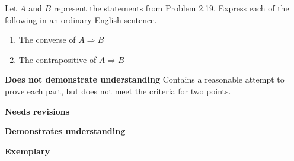 \documentclass[letterpaper, 11pt]{ximera}
\begin{document}
\begin{solution}
\end{solution}


\begin{ex}
 Let $A$ and $B$ represent the statements from Problem 2.19. Express each of the following in an ordinary English sentence.
 
\begin{enumerate}[label=(\alph*)]
 \item The converse of $A\Rightarrow B$
  \item The contrapositive of $A\Rightarrow B$
\end{enumerate}
\end{ex}

\begin{writeRubric}
    \item \textbf{Does not demonstrate understanding}
     Contains a reasonable attempt to prove each part, but does not meet the criteria for two points.
    \item \textbf{Needs revisions}
     
    \item \textbf{Demonstrates understanding}
    
    \item \textbf{Exemplary}
        
\end{writeRubric}
                                       \begin{solution}
\end{solution}
\end{document}
